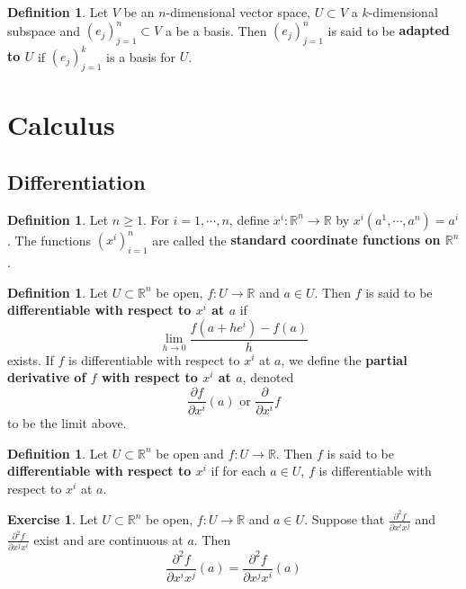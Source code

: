\documentclass{book}
\theoremstyle{definition}
\newtheorem{defn}[definition]{Definition}
\newtheorem{ex}[definition]{Exercise}
\newcommand{\R}{\mathbb{R}}
\newcommand{\lex}[1]{\label{ex:#1}}
\newcommand{\ld}[1]{\label{defn:#1}}
\DeclareMathOperator*{\0}{\mbf{0}}
\DeclareMathOperator*{\1}{\mbf{1}}
\newcommand{\tbf}[1]{\textbf{#1}}
\newcommand{\p}{\partial}
\begin{document}
	\begin{defn}
		Let $V$ be an $n$-dimensional vector space, $U \subset V$ a $k$-dimensional subspace and $(e_j)_{j=1}^n \subset V$ a be a basis. Then $(e_j)_{j=1}^n$ is said to be \tbf{adapted to $U$} if $(e_j)_{j=1}^k$ is a basis for $U$.
	\end{defn}








	
	\newpage
	\section{Calculus}
	
	\subsection{Differentiation}
	
	\begin{defn} \ld{21001}
		Let $n \geq 1$. For $i = 1, \cdots, n$, define $x^i: \R^n \rightarrow \R$ by $x^i(a^1, \cdots, a^n) = a^i$. The functions $(x^i)_{i=1}^n$ are called the \tbf{standard coordinate functions on $\R^n$}. 
	\end{defn}
	
	\begin{defn} \ld{21002}
		Let $U \subset \R^n$ be open, $f: U \rightarrow \R$ and $a \in U$. Then $f$ is said to be \tbf{differentiable with respect to $x^i$ at $a$} if $$\lim\limits_{h \rightarrow 0} \frac{f(a + he^i) - f(a)}{h}$$ exists. If $f$ is differentiable with respect to $x^i$ at $a$, we define the \tbf{partial derivative of $f$ with respect to $x^i$ at $a$}, denoted $$\frac{\p f}{\p x^i} (a) \text{ or } \frac{\p}{\p x^i} f $$ to be the limit above.
		
	\end{defn}
		
	\begin{defn} \ld{21003}
		Let $U \subset \R^n$ be open and $f: U \rightarrow \R$. Then $f$ is said to be \tbf{differentiable with respect to $x^i$} if for each $a \in U$, $f$ is differentiable with respect to $x^i$ at $a$.
	\end{defn}

	\begin{ex}\lex{21004}
		Let $U \subset \R^n$ be open, $f: U \rightarrow \R$ and $a \in U$. Suppose that $\frac{\partial ^2 f}{\partial x^i x^j}$ and $\frac{\partial ^2 f}{\partial x^j x^i}$ exist and are continuous at $a$. Then $$\frac{\partial ^2 f}{\partial x^i x^j} (a) = \frac{\partial ^2 f}{\partial x^j x^i} (a)$$
	\end{ex}
\end{document}
